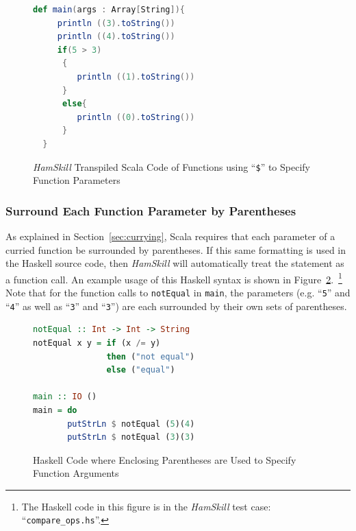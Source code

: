 \documentclass{report}
\begin{document}
\begin{figure}[H]
\begin{mdframed}
\begin{lstlisting}[basicstyle=\small, language=scala]
  def main(args : Array[String]){
     println ((3).toString())
     println ((4).toString())
     if(5 > 3)
      {
         println ((1).toString())
      }
      else{
         println ((0).toString())
      }
  } 
\end{lstlisting}
\end{mdframed}
\caption{\textit{HamSkill} Transpiled Scala Code of Functions using ``\texttt{\$}'' to Specify Function Parameters}\label{fig:useDollarSignScala}
\end{figure}

\subsubsection{Surround Each Function Parameter by Parentheses}

As explained in Section~\ref{sec:currying}, Scala requires that each parameter of a curried function be surrounded by parentheses. If this same formatting is used in the Haskell source code, then \textit{HamSkill} will automatically treat the statement as a function call.  An example usage of this Haskell syntax is shown in Figure~\ref{fig:haskellFunctionParenthesesFuncArgs}.~\footnote{The Haskell code in this figure is in the \textit{HamSkill} test case: ``\texttt{compare\_ops.hs}''.}  Note that for the function calls to \texttt{notEqual} in \texttt{main}, the parameters (e.g. ``\texttt{5}'' and ``\texttt{4}'' as well as ``\texttt{3}'' and ``\texttt{3}'') are each surrounded by their own sets of parentheses.

\begin{figure}[H]
\begin{mdframed}
\begin{lstlisting}[language=Haskell]
notEqual :: Int -> Int -> String
notEqual x y = if (x /= y)
               then ("not equal")
               else ("equal")
               
main :: IO ()
main = do 
       putStrLn $ notEqual (5)(4)
       putStrLn $ notEqual (3)(3)
\end{lstlisting}
\end{mdframed}
\caption{Haskell Code where Enclosing Parentheses are Used to Specify Function Arguments}\label{fig:haskellFunctionParenthesesFuncArgs}
\end{figure}
\end{document}
